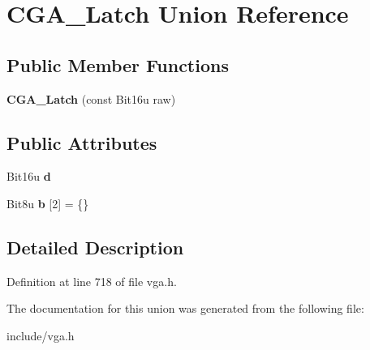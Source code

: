 \hypertarget{unionCGA__Latch}{\section{C\-G\-A\-\_\-\-Latch Union Reference}
\label{unionCGA__Latch}
}
\subsection*{Public Member Functions}
\begin{DoxyCompactItemize}
\item 
\hypertarget{unionCGA__Latch_af611e77568b12c799d54ed1308be9612}{{\bfseries C\-G\-A\-\_\-\-Latch} (const Bit16u raw)}\label{unionCGA__Latch_af611e77568b12c799d54ed1308be9612}

\end{DoxyCompactItemize}
\subsection*{Public Attributes}
\begin{DoxyCompactItemize}
\item 
\hypertarget{unionCGA__Latch_a926628ba2dc3d4e3dfb5302df9b33c0f}{Bit16u {\bfseries d}}\label{unionCGA__Latch_a926628ba2dc3d4e3dfb5302df9b33c0f}

\item 
\hypertarget{unionCGA__Latch_afccc1120de7efa91b9c700ec529f6d11}{Bit8u {\bfseries b} \mbox{[}2\mbox{]} = \{\}}\label{unionCGA__Latch_afccc1120de7efa91b9c700ec529f6d11}

\end{DoxyCompactItemize}


\subsection{Detailed Description}


Definition at line 718 of file vga.\-h.



The documentation for this union was generated from the following file\-:\begin{DoxyCompactItemize}
\item 
include/vga.\-h\end{DoxyCompactItemize}
